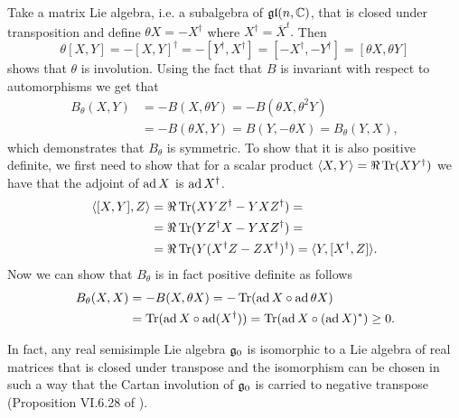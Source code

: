 Take a matrix Lie algebra, i.e. a subalgebra of $\mathfrak{gl}(n,\mathbb{C})$, that is closed under transposition and define $\theta X = -X^\dag$ where $X^\dag = \overline{X}^t.$ Then
 \[
  \theta [X,Y] = -[X,Y]^\dag = - [Y^\dag,X^\dag] = [-X^\dag,-Y^\dag] = [\theta X, \theta Y]
 \]
 shows that $\theta$ is involution. Using the fact that $B$ is invariant with respect to automorphisms we get that
 \begin{align*}
  B_\theta(X,Y) &= -B(X, \theta Y) = - B(\theta X, \theta^2 Y) \\
                &= -B(\theta X, Y) = B(Y, -\theta X) = B_\theta(Y, X),
 \end{align*}
 which demonstrates that $B_\theta$ is symmetric. To show that it is also positive definite, we first need to show that for a scalar product $\langle X,Y \rangle = \Re \operatorname{\mathrm{Tr}} (XY^\dag)$ we have that the adjoint of $\operatorname{\mathrm{ad}} X$ is $\operatorname{\mathrm{ad}} X^\dag$.
 \begin{align*}
  \langle [X,Y],Z \rangle &= \Re\tr (XYZ^\dag - YXZ^\dag) = \\
			  &= \Re\tr (YZ^\dag X - YXZ^\dag) =  \\%
                          &= \Re\tr( Y(X^\dag Z - ZX^\dag)^\dag) = \langle Y, [X^\dag,Z] \rangle.
 \end{align*}
 Now we can show that $B_\theta$ is in fact positive definite as follows
 \begin{align*}
  B_\theta(X,X) &= -B(X,\theta X) = -\operatorname{\mathrm{Tr}} (\operatorname{\mathrm{ad}} X \circ \operatorname{\mathrm{ad}} \theta X )\\
                &= \operatorname{\mathrm{Tr}} (\operatorname{\mathrm{ad}} X \circ \operatorname{\mathrm{ad}} (X^\dag))  = \operatorname{\mathrm{Tr}} (\operatorname{\mathrm{ad}} X \circ (\operatorname{\mathrm{ad}} X)^*) \geq 0.
 \end{align*}

In fact, any real semisimple Lie algebra $\mathfrak{g}_0$ is isomorphic to a Lie algebra of real matrices that is closed under transpose and the isomorphism can be chosen in such a way that the Cartan involution of $\mathfrak{g}_0$ is carried to negative transpose (Proposition VI.6.28 of \cite{knapp_lie_1996}).

